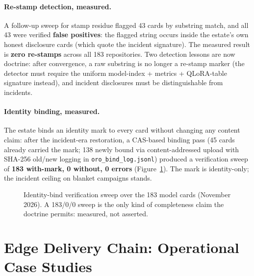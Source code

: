 ﻿\documentclass[11pt]{article}
\begin{document}
\paragraph{Re-stamp detection, measured.} A follow-up sweep for stamp residue flagged 43 cards by substring match, and all 43 were verified \textbf{false positives}: the flagged string occurs inside the estate's own honest disclosure cards (which quote the incident signature). The measured result is \textbf{zero re-stamps} across all 183 repositories. Two detection lessons are now doctrine: after convergence, a raw substring is no longer a re-stamp marker (the detector must require the uniform model-index + metrics + QLoRA-table signature instead), and incident disclosures must be distinguishable from incidents.

\paragraph{Identity binding, measured.} The estate binds an identity mark to every card without changing any content claim: after the incident-era restoration, a CAS-based binding pass (45 cards already carried the mark; 138 newly bound via content-addressed upload with SHA-256 old/new logging in \texttt{oro\_bind\_log.jsonl}) produced a verification sweep of \textbf{183 with-mark, 0 without, 0 errors} (Figure~\ref{fig:oro}). The mark is identity-only; the incident ceiling on blanket campaigns stands.

\begin{figure}[htbp]
\centering
{}
\caption{Identity-bind verification sweep over the 183 model cards (November 2026). A 183/0/0 sweep is the only kind of completeness claim the doctrine permits: measured, not asserted.}
\label{fig:oro}
\end{figure}

\section{Edge Delivery Chain: Operational Case Studies}
\label{sec:edge}
\end{document}
